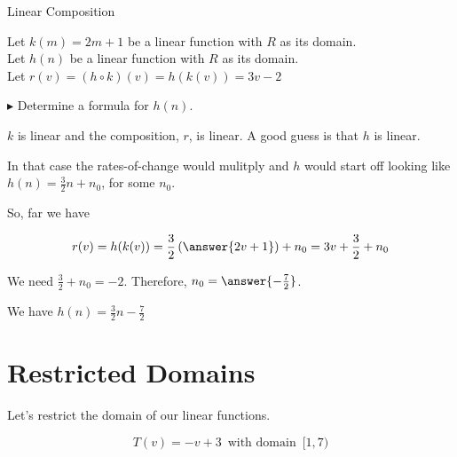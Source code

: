 \documentclass{ximera}
\begin{document}
\begin{example} Linear Composition

Let $k(m) = 2 m + 1$ be a linear function with \textbf{$R$} as its domain. \\
Let $h(n)$ be a linear function with \textbf{$R$} as its domain. \\


Let $r(v) = (h \circ k)(v) = h(k(v)) = 3 v - 2$ 

$\blacktriangleright$  Determine a formula for $h(n)$.







$k$ is linear and the composition, $r$, is linear. A good guess is that $h$ is linear.  

In that case the rates-of-change would mulitply and $h$ would start off looking like $h(n) = \frac{3}{2} n + n_0$, for some $n_0$.


So, far we have 

\[   r(v) = h(k(v)) = \frac{3}{2} \left( \answer{2 v + 1} \right) + n_0 =  3 v + \frac{3}{2} + n_0\]


We need $\frac{3}{2} + n_0 = -2$.  Therefore, $n_0 = \answer{-\frac{7}{2}}$.


We have $h(n) = \frac{3}{2} n - \frac{7}{2}$

\end{example}








\section{Restricted Domains}


Let's restrict the domain of our linear functions.









\[  T(v) = -v+3  \, \text{ with domain } \,  [1,7)   \]
\end{document}
